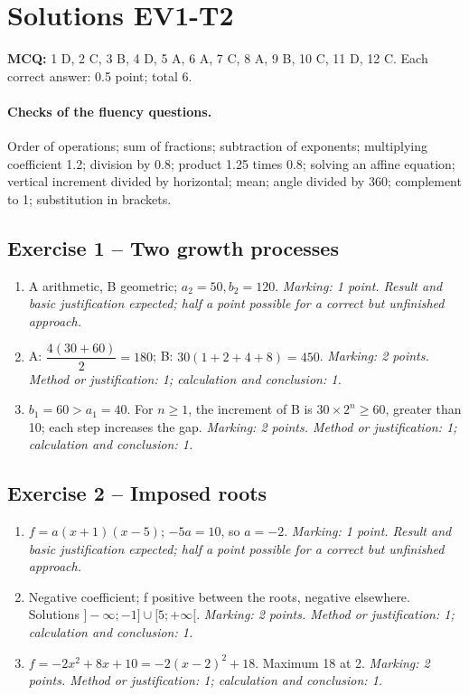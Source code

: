 \clearpage\section*{Solutions EV1-T2}\label{EV1-T2-CORR}
\textbf{MCQ:} 1 D, 2 C, 3 B, 4 D, 5 A, 6 A, 7 C, 8 A, 9 B, 10 C, 11 D, 12 C. Each correct answer: 0.5 point; total 6.
\paragraph{Checks of the fluency questions.} Order of operations; sum of fractions; subtraction of exponents; multiplying coefficient 1.2; division by 0.8; product 1.25 times 0.8; solving an affine equation; vertical increment divided by horizontal; mean; angle divided by 360; complement to 1; substitution in brackets.
\subsection*{Exercise 1 -- Two growth processes}
\begin{enumerate}
\item A arithmetic, B geometric; $a_2=50,b_2=120$. \textit{Marking: 1 point. Result and basic justification expected; half a point possible for a correct but unfinished approach.}
\item A: $\dfrac{4(30+60)}{2}=180$; B: $30(1+2+4+8)=450$. \textit{Marking: 2 points. Method or justification: 1; calculation and conclusion: 1.}
\item $b_1=60>a_1=40$. For $n\geq1$, the increment of B is $30\times2^n\geq60$, greater than 10; each step increases the gap. \textit{Marking: 2 points. Method or justification: 1; calculation and conclusion: 1.}
\end{enumerate}
\subsection*{Exercise 2 -- Imposed roots}
\begin{enumerate}
\item $f=a(x+1)(x-5)$; $-5a=10$, so $a=-2$. \textit{Marking: 1 point. Result and basic justification expected; half a point possible for a correct but unfinished approach.}
\item Negative coefficient; f positive between the roots, negative elsewhere. Solutions $]-\infty;-1]\cup[5;+\infty[$. \textit{Marking: 2 points. Method or justification: 1; calculation and conclusion: 1.}
\item $f=-2x^2+8x+10=-2(x-2)^2+18$. Maximum 18 at 2. \textit{Marking: 2 points. Method or justification: 1; calculation and conclusion: 1.}
\end{enumerate}
